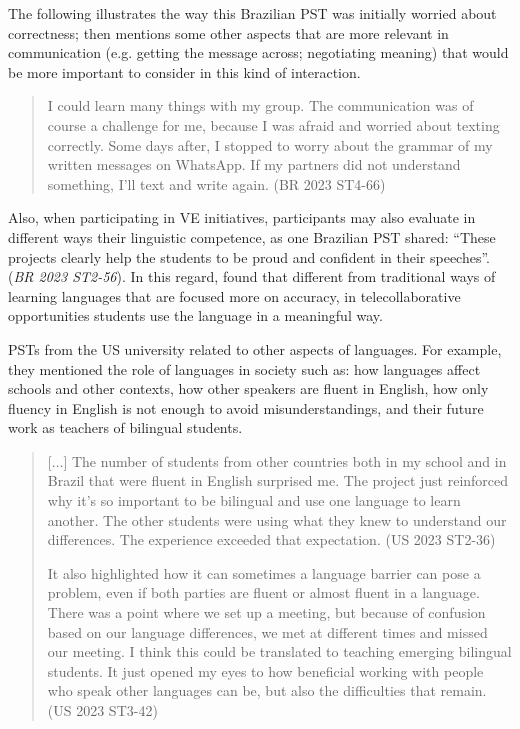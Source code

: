 The following illustrates the way this Brazilian PST was initially
worried about correctness; then mentions some other aspects that are
more relevant in communication (e.g. getting the message across;
negotiating meaning) that would be more important to consider in this
kind of interaction.

\begin{quote}
I could learn many things with my group. The communication was of
course a challenge for me, because I was afraid and worried about
texting correctly. Some days after, I stopped to worry about the grammar
of my written messages on WhatsApp. If my partners did not understand
something, I’ll text and write again. (BR 2023
ST4-66)
\end{quote}

Also, when participating in VE initiatives, participants may also
evaluate in different ways their linguistic competence, as one Brazilian
PST shared: \enquote{These projects clearly help the students to be proud and confident in their speeches}. (\emph{BR 2023 ST2-56}). In this
regard, \textcite[p. 217]{odowd2021virtual} found that different from
traditional ways of learning languages that are focused more on
accuracy, in telecollaborative opportunities students use the language
in a meaningful way.

PSTs from the US university related to other aspects of languages. For
example, they mentioned the role of languages in society such as: how
languages affect schools and other contexts, how other speakers are
fluent in English, how only fluency in English is not enough to avoid
misunderstandings, and their future work as teachers of bilingual
students.

\begin{quote}
[$\ldots$] The number of students from other countries both in my
school and in Brazil that were fluent in English surprised me. The
project just reinforced why it’s so important to be
bilingual and use one language to learn another. The other students were
using what they knew to understand our differences. The experience
exceeded that expectation. (US 2023 ST2-36)
	
It also highlighted how it can sometimes a language barrier can
pose a problem, even if both parties are fluent or almost fluent in a
language. There was a point where we set up a meeting, but because of
confusion based on our language differences, we met at different times
and missed our meeting. I think this could be translated to teaching
emerging bilingual students. It just opened my eyes to how beneficial
working with people who speak other languages can be, but also the
difficulties that remain. (US 2023 ST3-42)
\end{quote}

